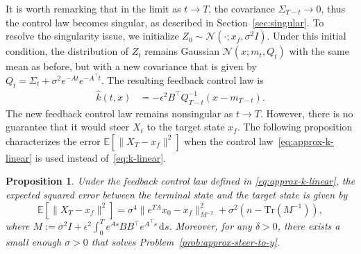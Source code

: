 \documentclass[letterpaper, 10 pt, conference]{ieeeconf}  %
\newcommand{\at}[1]{{\color{blue} #1}}
\def\Expect{{\mathbb E}}
\newtheorem{proposition}{Proposition}
\newcommand{\trace}{\text{Tr}}
\newcommand{\ud}{\,\mathrm{d}}
\begin{document}
It is worth remarking that in the limit as $t \to T$, the covariance $\Sigma_{T-t} \to 0$, thus the control law becomes singular, as described in Section~\ref{sec:singular}. To resolve the singularity issue, we initialize $Z_0 \sim \mathcal{N}(\cdot;x_f,\sigma^2I)$. Under this initial condition, the distribution of $Z_t$ remains Gaussian $\mathcal N(x;m_t,Q_t)$ with the same mean  as before, but with a new covariance that is given by 
$
    Q_t = \Sigma_t + \sigma^2 e^{-At}e^{-A^\top t}
$.
The resulting feedback control law is
\begin{align}\label{eq:approx-k-linear}
    \hat k(t,x) 
    &= -\epsilon^2 B^\top Q_{T-t}^{-1}(x-m_{T-t}).
\end{align}
The new feedback control law remains nonsingular as $t\to T$. However, there is no guarantee that it would steer $X_t$ to the target state $x_f$. The following proposition  characterizes the error $\mathbb E[\|X_T-x_f\|^2]$ when the control law~\eqref{eq:approx-k-linear} is used instead of~\eqref{eq:k-linear}. 
\begin{proposition}\label{prop:terminal-error}
    Under the feedback control law defined in \eqref{eq:approx-k-linear}, the expected squared error between the terminal state and the target state is given by
    \begin{equation}\label{eq:error}
        \Expect[\|X_T-x_f\|^2] = \sigma^4\|e^{TA}x_0-x_f\|^2_{M^{-2}} + \sigma^2(n -\trace(M^{-1})),
    \end{equation}
    where $M := \sigma^2 I +  \epsilon^2\int_0^T e^{As}BB^\top e^{A^\top s}\ud s$. Moreover, for any $\delta>0$, there exists a small enough $\sigma>0$ that solves Problem~\ref{prob:approx-steer-to-y}.
\end{proposition}
\end{document}
